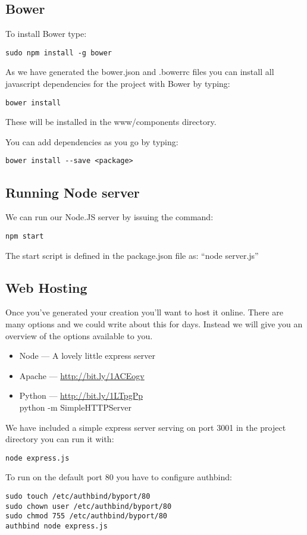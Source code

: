 \documentclass[twocolumn]{article}
\begin{document}
\subsection{Bower}
To install Bower type:

\begin{lstlisting}
sudo npm install -g bower
\end{lstlisting}

As we have generated the bower.json and .bowerrc files you can install all javascript dependencies for the project with Bower by typing:
\begin{lstlisting}
bower install
\end{lstlisting}
These will be installed in the www/components directory.

You can add dependencies as you go by typing:
\begin{lstlisting}
bower install --save <package>
\end{lstlisting}

\subsection{Running Node server}
We can run our Node.JS server by issuing the command:
\begin{lstlisting}
npm start
\end{lstlisting}
The start script is defined in the package.json file as: ``node server.js''

\subsection{Web Hosting}

Once you've generated your creation you'll want to host it online. There are many options and we could write about this for days. Instead we will give you an overview of the options available to you.

\begin{itemize}
\item Node --- A lovely little express server
\item Apache --- \url{http://bit.ly/1ACEogv}
\item Python --- \url{http://bit.ly/1LTpgPp}\\python -m SimpleHTTPServer
\end{itemize}

We have included a simple express server serving on port 3001 in the project directory you can run it with:
\begin{lstlisting}
node express.js
\end{lstlisting}

To run on the default port 80 you have to configure authbind:
\begin{lstlisting}
sudo touch /etc/authbind/byport/80
sudo chown user /etc/authbind/byport/80
sudo chmod 755 /etc/authbind/byport/80
authbind node express.js
\end{lstlisting}
\end{document}
